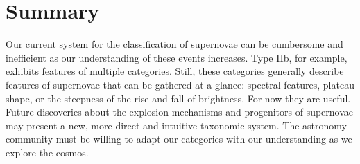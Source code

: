 \section{Summary}
Our current system for the classification of supernovae can be cumbersome and inefficient as our understanding of these events increases. Type IIb, for example, exhibits features of multiple categories. Still, these categories generally describe features of supernovae that can be gathered at a glance: spectral features, plateau shape, or the steepness of the rise and fall of brightness. For now they are useful. Future discoveries about the explosion mechanisms and progenitors of supernovae may present a new, more direct and intuitive taxonomic system. The astronomy community must be willing to adapt our categories with our understanding as we explore the cosmos.
